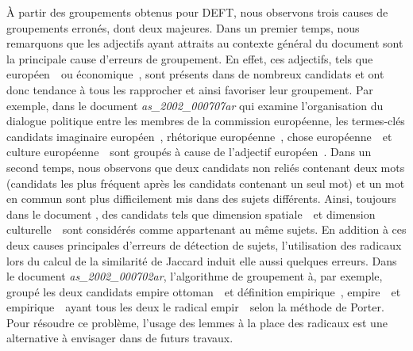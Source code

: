     À partir des groupements obtenus pour DEFT, nous observons trois causes de
    groupements erronés, dont deux majeures. Dans un premier temps, nous
    remarquons que les adjectifs ayant attraits au contexte général du document
    sont la principale cause d'erreurs de groupement. En effet, ces adjectifs,
    tels que \og européen~\fg\ ou \og économique~\fg, sont présents dans de
    nombreux candidats et ont donc tendance à tous les rapprocher et ainsi
    favoriser leur groupement. Par exemple, dans le document
    \textit{as\_2002\_000707ar} qui examine l'organisation du dialogue politique
    entre les membres de la commission européenne, les termes-clés candidats
    \og imaginaire européen~\fg, \og rhétorique européenne~\fg, \og chose
    européenne~\fg\ et \og culture européenne~\fg\ sont groupés à cause de
    l'adjectif \og européen~\fg. Dans un second temps, nous observons que deux
    candidats non reliés contenant deux mots (candidats les plus fréquent après
    les candidats contenant un seul mot) et un mot en commun sont plus
    difficilement mis dans des sujets différents. Ainsi, toujours dans le
    document , des candidats tels que \og dimension
    spatiale~\fg\ et \og dimension culturelle~\fg\ sont considérés comme
    appartenant au même sujets. En addition à ces deux causes principales
    d'erreurs de détection de sujets, l'utilisation des radicaux lors du
    calcul de la similarité de Jaccard induit elle aussi quelques erreurs. Dans
    le document \textit{as\_2002\_000702ar}, l'algorithme de groupement à, par
    exemple, groupé les deux candidats \og empire ottoman~\fg\ et \og définition
    empirique~\fg, \og empire~\fg\ et \og empirique~\fg\ ayant tous les deux le
    radical \og empir~\fg\ selon la méthode de Porter. Pour résoudre ce
    problème, l'usage des lemmes à la place des radicaux est une alternative à
    envisager dans de futurs travaux.

